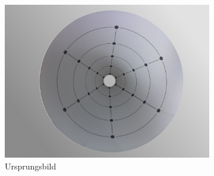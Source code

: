 \begin{figure}[!htb]
	\centering
	\begin{subfigure}{.5\textwidth}
		\centering
		\includegraphics[width=.9\textwidth]{images/coneRasp.jpg}
		\caption{Ursprungsbild}
	\end{subfigure}%
	\begin{subfigure}{.5\textwidth}
		\centering

\end{subfigure}
\end{figure}
